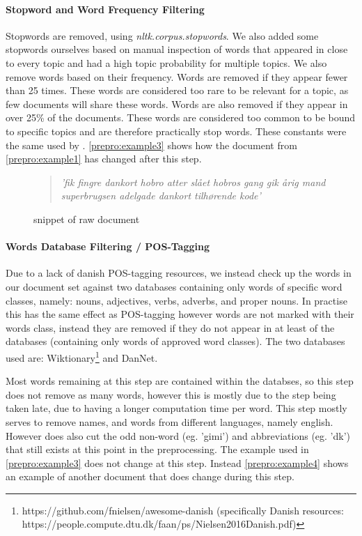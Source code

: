 \paragraph{Stopword and Word Frequency Filtering}
Stopwords are removed, using \emph{nltk.corpus.stopwords}. We also added some stopwords ourselves based on manual inspection of words that appeared in close to every topic and had a high topic probability for multiple topics.
We also remove words based on their frequency. 
Words are removed if they appear fewer than 25 times.
These words are considered too rare to be relevant for a topic, as few documents will share these words.
Words are also removed if they appear in over 25\% of the documents.
These words are considered too common to be bound to specific topics and are therefore practically stop words.
These constants were the same used by \cite{quanti}.
\autoref{prepro:example3} shows how the document from \autoref{prepro:example1} has changed after this step.
\begin{figure}[h]
	\begin{quote}
		\textit{
			'fik fingre dankort hobro atter slået hobros gang gik årig mand superbrugsen adelgade dankort tilhørende kode'
		}
	\end{quote}
	\caption{snippet of raw document}
	\label{prepro:example3}
\end{figure}


\paragraph{Words Database Filtering / POS-Tagging}
Due to a lack of danish POS-tagging resources, we instead check up the words in our document set against two databases containing only words of specific word classes, namely: nouns, adjectives, verbs, adverbs, and proper nouns.
In practise this has the same effect as POS-tagging however words are not marked with their words class, instead they are removed if they do not appear in at least of the databases (containing only words of approved word classes).
The two databases used are:  Wiktionary\footnote{https://github.com/fnielsen/awesome-danish (specifically Danish resources: https://people.compute.dtu.dk/faan/ps/Nielsen2016Danish.pdf)} and DanNet\cite{Pedersen2009DanNetTC}. 

Most words remaining at this step are contained within the databses, so this step does not remove as many words, however this is mostly due to the step being taken late, due to having a longer computation time per word.
This step mostly serves to remove names, and words from different languages, namely english.
However does also cut the odd non-word (eg. 'gimi') and abbreviations (eg. 'dk') that still exists at this point in the preprocessing.
The example used in \autoref{prepro:example3} does not change at this step. Instead \autoref{prepro:example4} shows an example of another document that does change during this step.

